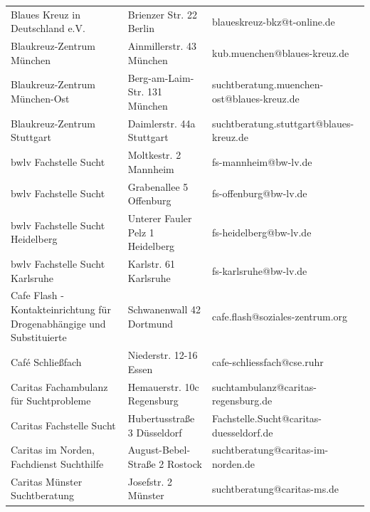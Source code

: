 {\begin{xltabular}{\textwidth} {
 >{\raggedright\arraybackslash}p{5cm}
 >{\raggedright\arraybackslash}X
 >{\raggedright\arraybackslash}p{5cm} }
Blaues Kreuz in Deutschland e.V. & Brienzer Str. 22 Berlin & blaueskreuz-bkz@t-online.de \\
Blaukreuz-Zentrum München & Ainmillerstr. 43 München & kub.muenchen@blaues-kreuz.de \\
Blaukreuz-Zentrum München-Ost & Berg-am-Laim-Str. 131 München & suchtberatung.muenchen-ost@blaues-kreuz.de \\
Blaukreuz-Zentrum Stuttgart & Daimlerstr. 44a Stuttgart & suchtberatung.stuttgart@blaues-kreuz.de \\
bwlv Fachstelle Sucht & Moltkestr. 2 Mannheim & fs-mannheim@bw-lv.de \\
bwlv Fachstelle Sucht & Grabenallee 5 Offenburg & fs-offenburg@bw-lv.de \\
bwlv Fachstelle Sucht Heidelberg & Unterer Fauler Pelz 1 Heidelberg & fs-heidelberg@bw-lv.de \\
bwlv Fachstelle Sucht Karlsruhe & Karlstr. 61 Karlsruhe & fs-karlsruhe@bw-lv.de \\
Cafe Flash - Kontakteinrichtung für Drogenabhängige und Substituierte & Schwanenwall 42 Dortmund & cafe.flash@soziales-zentrum.org \\
Café Schließfach & Niederstr. 12-16 Essen & cafe-schliessfach@cse.ruhr \\
Caritas Fachambulanz für Suchtprobleme & Hemauerstr. 10c Regensburg & suchtambulanz@caritas-regensburg.de \\
Caritas Fachstelle Sucht & Hubertusstraße 3 Düsseldorf & Fachstelle.Sucht@caritas-duesseldorf.de \\
Caritas im Norden, Fachdienst Suchthilfe & August-Bebel-Straße 2 Rostock & suchtberatung@caritas-im-norden.de \\
Caritas Münster Suchtberatung & Josefstr. 2 Münster & suchtberatung@caritas-ms.de \\

\end{xltabular}}
